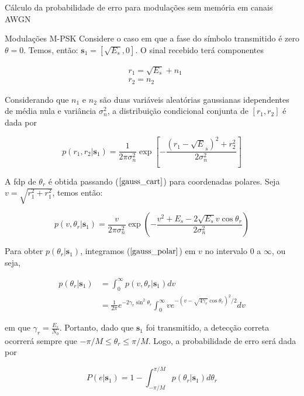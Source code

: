 \documentclass[
  ignorenonframetext,
]{beamer}
\begin{document}
\begin{frame}{Cálculo da probabilidade de erro para modulações sem
memória em canais AWGN}
\begin{block}{Modulações M-PSK}
Considere o caso em que a fase do símbolo transmitido é zero
\(\theta = 0\). Temos, então:
\(\mathbf{s}_1 =\left[\sqrt{E_s}, 0\right]\). O sinal recebido terá
componentes

\[
\begin{align}
& r_1 = \sqrt{E_s} + n_1 \nonumber\\
& r_2 = n_2\nonumber
\end{align}
\]

Considerando que \(n_1\) e \(n_2\) são duas variáveis aleatórias
gaussianas idependentes de média nula e variância \(\sigma_n^2\), a
distribuição condicional conjunta de \([r_1,r_2]\) é dada por

\begin{equation}\label{gauss_cart}
p(r_1, r_2|\mathbf{s}_1) = \frac{1}{2 \pi \sigma_n^2} \exp \left[- \frac{ \left(r_1-\sqrt{E}_s \right)^2 + r_2^2}{2\sigma_n^2}\right]
\end{equation}

A fdp de \(\theta_r\) é obtida passando (\(\ref{gauss_cart}\)) para
coordenadas polares. Seja \(v = \sqrt{r_1^2 + r_1^2}\), temos então:

\begin{equation}\label{gauss_polar}
p\left(v, \theta_r|\mathbf{s}_1\right)=\frac{v}{2 \pi \sigma_n^2} \exp \left(-\frac{v^2+E_s-2 \sqrt{E_s}v \cos \theta_r}{2 \sigma_n^2}\right)
\end{equation}

Para obter \(p\left(\theta_r|\mathbf{s}_1\right)\), integramos
(\(\ref{gauss_polar}\)) em \(v\) no intervalo \(0\) a \(\infty\), ou
seja,

\[
\begin{align}
p\left(\theta_r|\mathbf{s}_1\right) & =\int_0^{\infty}p\left(v, \theta_r|\mathbf{s}_1\right) dv \nonumber\\
& =\frac{1}{2 \pi} e^{-2 \gamma_r \sin ^2 \theta_r} \int_0^{\infty} v e^{-\left(v-\sqrt{4 \gamma_r} \cos \theta_r\right)^2 / 2} d v
\end{align}
\]

em que \(\gamma_r = \frac{E_s}{N_0}\). Portanto, dado que
\(\mathbf{s}_1\) foi transmitido, a detecção correta ocorrerá sempre que
\(-\pi/M \leq \theta_r \leq \pi/M\). Logo, a probabilidade de erro será
dada por

\begin{equation}\label{prob_err_psk}
P(e|\mathbf{s}_1)=1-\int_{-\pi/M}^{\pi/M} p\left(\theta_r|\mathbf{s}_1\right) d \theta_r
\end{equation}


\end{block}
\end{frame}
\end{document}
